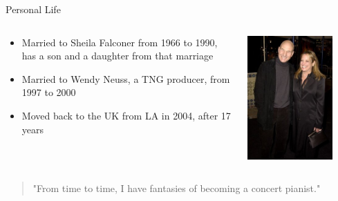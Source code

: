 \documentclass[xcolor=dvipsnames]{beamer}
\begin{document}
\begin{frame}{Personal Life}
  \begin{columns}
    \begin{column}{0.7\textwidth}
      \begin{itemize}
        \item Married to Sheila Falconer from 1966 to 1990, has a son and a daughter
        from that marriage
        \item Married to Wendy Neuss, a TNG producer, from 1997 to 2000
        \item Moved back to the UK from LA in 2004, after 17 years
        
      \end{itemize}
    \end{column}
    \begin{column}{0.3\textwidth}
      \includegraphics[width=0.8\textwidth]{withwife.jpg}
    \end{column}
  \end{columns}
  \begin{qct}
    \begin{quote}
      "From time to time, I have fantasies of becoming a concert
      pianist."
    \end{quote}
  \end{qct}
\end{frame}
\end{document}
